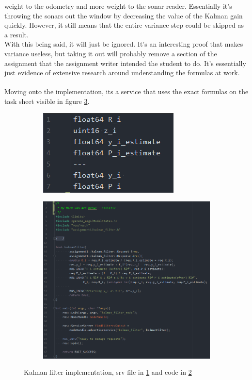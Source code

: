 \documentclass{article}
\newcommand\tab[1][1cm]{\hspace*{#1}}
\begin{document}
weight to the odometry and more weight to the sonar reader. Essentially it's
throwing the sonars out the window by decreasing the value of the Kalman gain
quickly. However, it still means that the entire variance step could be skipped
as a result. 
\\
\tab With this being said, it will just be ignored. It's an interesting proof that
makes variance useless, but taking it out will probably remove a section of the
assignment that the assignment writer intended the student to do. It's
essentially just evidence of extensive research around understanding the formulas
at work.
\\ \\
Moving onto the implementation, its a service that uses the exact formulas on
the task sheet visible in figure \ref{kalmanImplement}.
\begin{figure}[ht]
    \begin{subfigure}{.5\textwidth}
        \centering
        \includegraphics[scale=0.4]{img/kalman_filter_srv.png}
        \caption{}
        \label{kalmanSrv}
    \end{subfigure}
    \begin{subfigure}{.5\textwidth}
        \centering
        \includegraphics[scale=0.3]{img/kalman_filter.png}
        \caption{}
        \label{kalmanCode}
    \end{subfigure}
    \caption{Kalman filter implementation, srv file in \ref{kalmanSrv} and code
    in \ref{kalmanCode}}
    \label{kalmanImplement}
\end{figure}
\end{document}
